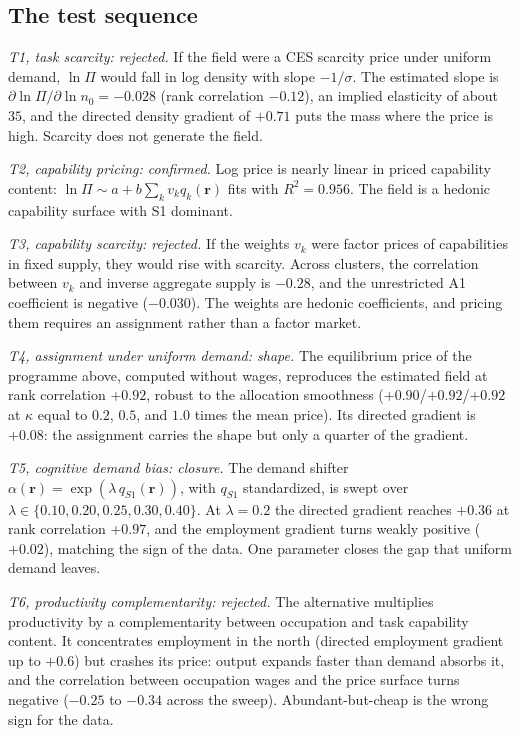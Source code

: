 \documentclass[12pt, a4paper]{article}
\begin{document}
\subsection*{The test sequence}

\emph{T1, task scarcity: rejected.} If the field were a CES scarcity
price under uniform demand, $\ln\Pi$ would fall in log density with
slope $-1/\sigma$. The estimated slope is
$\partial\ln\Pi/\partial\ln n_0 = -0.028$ (rank correlation $-0.12$),
an implied elasticity of about $35$, and the directed density gradient
of $+0.71$ puts the mass where the price is high. Scarcity does not
generate the field.

\emph{T2, capability pricing: confirmed.} Log price is nearly linear
in priced capability content:
$\ln\Pi \sim a + b \sum_k v_k q_k(\mathbf{r})$ fits with
$R^2 = 0.956$. The field is a hedonic capability surface with S1
dominant.

\emph{T3, capability scarcity: rejected.} If the weights $v_k$ were
factor prices of capabilities in fixed supply, they would rise with
scarcity. Across clusters, the correlation between $v_k$ and inverse
aggregate supply is $-0.28$, and the unrestricted A1 coefficient is
negative ($-0.030$). The weights are hedonic coefficients, and pricing
them requires an assignment rather than a factor market.

\emph{T4, assignment under uniform demand: shape.} The equilibrium
price of the programme above, computed without wages, reproduces the
estimated field at rank correlation $+0.92$, robust to the allocation
smoothness ($+0.90$/$+0.92$/$+0.92$ at $\kappa$ equal to $0.2$, $0.5$,
and $1.0$ times the mean price). Its directed gradient is $+0.08$:
the assignment carries the shape but only a quarter of the gradient.

\emph{T5, cognitive demand bias: closure.} The demand shifter
$\alpha(\mathbf{r}) = \exp(\lambda\, q_{S1}(\mathbf{r}))$, with $q_{S1}$
standardized, is swept over
$\lambda \in \{0.10, 0.20, 0.25, 0.30, 0.40\}$. At $\lambda = 0.2$ the
directed gradient reaches $+0.36$ at rank correlation $+0.97$, and the
employment gradient turns weakly positive ($+0.02$), matching the sign
of the data. One parameter closes the gap that uniform demand leaves.

\emph{T6, productivity complementarity: rejected.} The alternative
multiplies productivity by a complementarity between occupation and
task capability content. It concentrates employment in the north
(directed employment gradient up to $+0.6$) but crashes its price:
output expands faster than demand absorbs it, and the correlation
between occupation wages and the price surface turns negative
($-0.25$ to $-0.34$ across the sweep). Abundant-but-cheap is the
wrong sign for the data.
\end{document}
